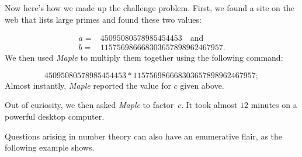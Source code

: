 \begin{example}
Now here's how we made up the challenge problem.  First, we found a
site on the web that lists large primes and found these two values:

\begin{align*}
a = & 45095080578985454453\quad\text{and}\\ 
b = & 115756986668303657898962467957.
\end{align*}
We then used \emph{Maple} to multiply them together using the following command:

\[
45095080578985454453*115756986668303657898962467957;
\]
Almost instantly, \emph{Maple} reported the value for $c$ given above.

Out of curiosity, we then asked \emph{Maple} to factor~$c$.  It took almost
$12$ minutes on a powerful desktop computer.
\end{example}

Questions arising in number theory can also have an enumerative flair,
as the following example shows.

